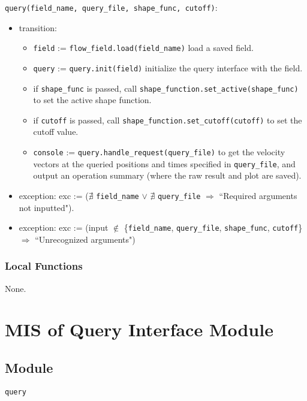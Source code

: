 \documentclass[12pt, titlepage]{article}
\begin{document}
\noindent \texttt{query(field\_name, query\_file, shape\_func, cutoff)}:
\begin{itemize}
  \item transition:
  \begin{itemize}
    \item \texttt{field} := \texttt{flow\_field.load(field\_name)} load a saved field.
    \item \texttt{query} := \texttt{query.init(field)} initialize the query interface with the field.
    \item if \texttt{shape\_func} is passed, call \texttt{shape\_function.set\_active(shape\_func)} to set the active shape function.
    \item if \texttt{cutoff} is passed, call \texttt{shape\_function.set\_cutoff(cutoff)} to set the cutoff value.
    \item \texttt{console} := \texttt{query.handle\_request(query\_file)} to get the velocity vectors at the queried positions and times specified in \texttt{query\_file}, and output an operation summary (where the raw result and plot are saved).
  \end{itemize}
  \item exception: exc := ($\nexists$ \texttt{field\_name} $\vee$ $\nexists$ \texttt{query\_file} $\Rightarrow$ ``Required arguments not inputted"). 
  \item exception: exc := (input $\notin$ \{\texttt{field\_name}, \texttt{query\_file}, \texttt{shape\_func}, \texttt{cutoff}\} $\Rightarrow$ ``Unrecognized arguments")
\end{itemize}

\subsubsection{Local Functions}

None.


\newpage
\section{MIS of Query Interface Module} \label{mQuery} 



\subsection{Module}
\texttt{query}
\end{document}
